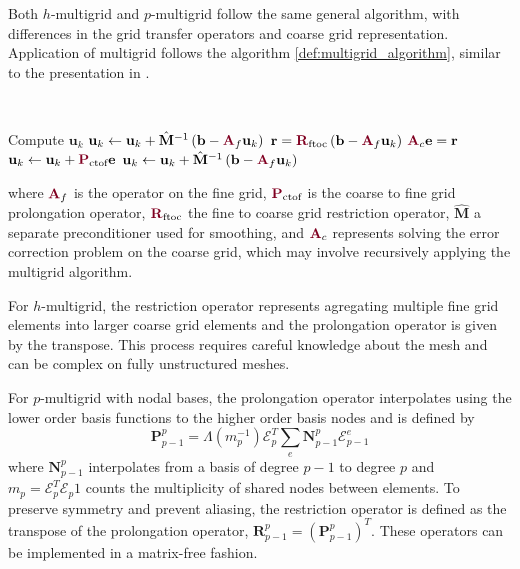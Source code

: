 Both $h$-multigrid and $p$-multigrid follow the same general algorithm, with differences in the grid transfer operators and coarse grid representation.
Application of multigrid follows the algorithm \ref{def:multigrid_algorithm}, similar to the presentation in \cite{brandt1982guide}.
\begin{definition}\label{def:multigrid_algorithm}
~\\
\begin{algorithmic}[1]
\State Compute $\mathbf{u}_k$
\State $\mathbf{u}_k \gets \mathbf{u}_k + \hat{\mathbf{M}}^{-1} \left( \mathbf{b} - {\color{burgundy}\mathbf{A}}_f \mathbf{u}_k \right)$ 
\State $\mathbf{r} = {\color{burgundy}\mathbf{R}}_{\text{ftoc}} \left( \mathbf{b} - {\color{burgundy}\mathbf{A}}_f \mathbf{u}_k \right)$ 
\State ${\color{burgundy}\mathbf{A}}_c \mathbf{e} = \mathbf{r}$                                                                          
\State $\mathbf{u}_k \gets \mathbf{u}_k + {\color{burgundy}\mathbf{P}}_{\text{ctof}} \mathbf{e}$                                         
\State $\mathbf{u}_k \gets \mathbf{u}_k + \hat{\mathbf{M}}^{-1} \left( \mathbf{b} - {\color{burgundy}\mathbf{A}}_f \mathbf{u}_k \right)$ 
\end{algorithmic}
\end{definition}
where ${\color{burgundy}\mathbf{A}}_f$ is the operator on the fine grid, ${\color{burgundy}\mathbf{P}}_{\text{ctof}}$ is the coarse to fine grid prolongation operator, ${\color{burgundy}\mathbf{R}}_{\text{ftoc}}$ the fine to coarse grid restriction operator, $\hat{\mathbf{M}}$ a separate preconditioner used for smoothing, and ${\color{burgundy}\mathbf{A}}_c$ represents solving the error correction problem on the coarse grid, which may involve recursively applying the multigrid algorithm.

For $h$-multigrid, the restriction operator represents agregating multiple fine grid elements into larger coarse grid elements and the prolongation operator is given by the transpose.
This process requires careful knowledge about the mesh and can be complex on fully unstructured meshes.

For $p$-multigrid with nodal bases, the prolongation operator interpolates using the lower order basis functions to the higher order basis nodes and is defined by
\begin{equation}
\mathbf{P}_{p - 1}^p = \Lambda \left( m_p^{-1} \right) \mathcal{E}_p^T \sum_e \mathbf{N}_{p - 1}^p \mathcal{E}^e_{p - 1}
\label{mg_prolong}
\end{equation}
where $\mathbf{N}_{p - 1}^p$ interpolates from a basis of degree $p - 1$ to degree $p$ and $m_p = \mathcal{E}_p^T \mathcal{E}_p 1$ counts the multiplicity of shared nodes between elements.
To preserve symmetry and prevent aliasing, the restriction operator is defined as the transpose of the prolongation operator, $\mathbf{R}_{p - 1}^p = \left( \mathbf{P}_{p - 1}^p \right)^T$.
These operators can be implemented in a matrix-free fashion.

